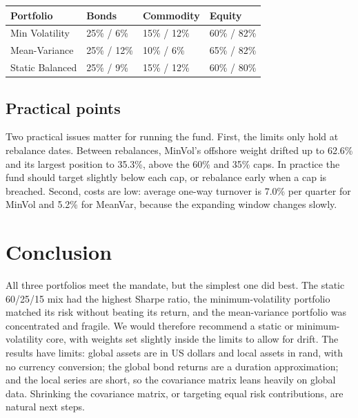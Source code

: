 \documentclass[11pt,preprint]{elsarticle}
\let\origtable\table
\let\endorigtable\endtable
\renewenvironment{table}[1][2] {
    \expandafter\origtable\expandafter[H]
} {
    \endorigtable
}
\numberwithin{equation}{section}
\numberwithin{figure}{section}
\numberwithin{table}{section}
\begin{document}
\begin{table}[H]
\centering
\caption{Weight / share of risk by asset class at the June 2026 rebalance \label{tab:risk}} 
\begingroup\footnotesize
\begin{tabular}{llll}
  \hline
Portfolio & Bonds & Commodity & Equity \\ 
  \hline
Min Volatility & 25\% / 6\% & 15\% / 12\% & 60\% / 82\% \\ 
  Mean-Variance & 25\% / 12\% & 10\% / 6\% & 65\% / 82\% \\ 
  Static Balanced & 25\% / 9\% & 15\% / 12\% & 60\% / 80\% \\ 
   \hline
\end{tabular}
\endgroup
\end{table}

\subsection{Practical points}\label{practical-points}

Two practical issues matter for running the fund. First, the limits only
hold at rebalance dates. Between rebalances, MinVol's offshore weight
drifted up to 62.6\% and its largest position to 35.3\%, above the 60\%
and 35\% caps. In practice the fund should target slightly below each
cap, or rebalance early when a cap is breached. Second, costs are low:
average one-way turnover is 7.0\% per quarter for MinVol and 5.2\% for
MeanVar, because the expanding window changes slowly.

\section{\texorpdfstring{Conclusion
\label{Conclusion}}{Conclusion }}\label{conclusion}

All three portfolios meet the mandate, but the simplest one did best.
The static 60/25/15 mix had the highest Sharpe ratio, the
minimum-volatility portfolio matched its risk without beating its
return, and the mean-variance portfolio was concentrated and fragile. We
would therefore recommend a static or minimum-volatility core, with
weights set slightly inside the limits to allow for drift. The results
have limits: global assets are in US dollars and local assets in rand,
with no currency conversion; the global bond returns are a duration
approximation; and the local series are short, so the covariance matrix
leans heavily on global data. Shrinking the covariance matrix, or
targeting equal risk contributions, are natural next steps.
\end{document}
